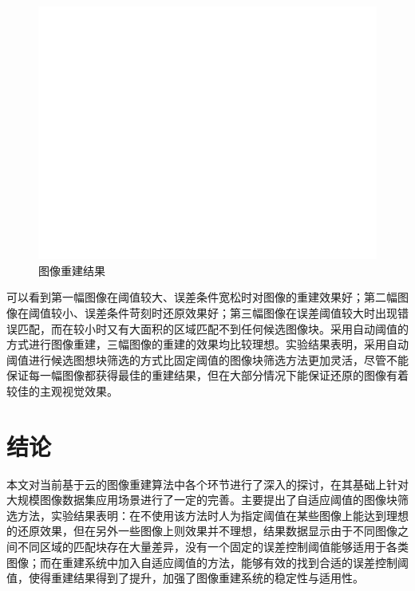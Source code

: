 \documentclass[UTF8]{csoarticle}
\begin{document}
\begin{figure}
\centering\includegraphics[width=15cm]{rec_result}
\caption{图像重建结果}
\label{fig:result}
\end{figure}

可以看到第一幅图像在阈值较大、误差条件宽松时对图像的重建效果好；第二幅图像在阈值较小、误差条件苛刻时还原效果好；第三幅图像在误差阈值较大时出现错误匹配，而在较小时又有大面积的区域匹配不到任何候选图像块。采用自动阈值的方式进行图像重建，三幅图像的重建的效果均比较理想。实验结果表明，采用自动阈值进行候选图想块筛选的方式比固定阈值的图像块筛选方法更加灵活，尽管不能保证每一幅图像都获得最佳的重建结果，但在大部分情况下能保证还原的图像有着较佳的主观视觉效果。

\section{结论}

本文对当前基于云的图像重建算法中各个环节进行了深入的探讨，在其基础上针对大规模图像数据集应用场景进行了一定的完善。主要提出了自适应阈值的图像块筛选方法，实验结果表明：在不使用该方法时人为指定阈值在某些图像上能达到理想的还原效果，但在另外一些图像上则效果并不理想，结果数据显示由于不同图像之间不同区域的匹配块存在大量差异，没有一个固定的误差控制阈值能够适用于各类图像；而在重建系统中加入自适应阈值的方法，能够有效的找到合适的误差控制阈值，使得重建结果得到了提升，加强了图像重建系统的稳定性与适用性。
\end{document}
